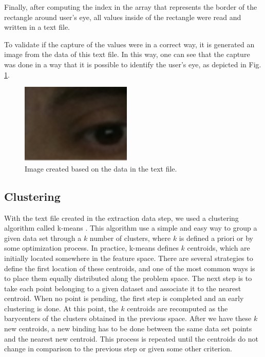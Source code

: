 \documentclass[10pt, conference]{IEEEtran}
\begin{document}
	Finally, after computing the index in the array that represents the border of the rectangle around user's eye, all values inside of the rectangle were read and written in a text file. 

	To validate if the capture of the values were in a correct way, it is generated an image from the data of this text file. 
	In this way, one can see that the capture was done in a way that it is possible to identify the user's eye, as depicted in Fig. \ref{fig:fig13}.

    \begin{figure}[t]
      \centering
      \includegraphics{figures/pic13.png}
      \caption{Image created based on the data in the text file.}
      \label{fig:fig13}
    \end{figure}

\subsection{Clustering}

	With the text file created in the extraction data step, we used a clustering algorithm called k-means \cite{13}. 
	This algorithm use a simple and easy way to group a given data set through a $k$ number of clusters, where $k$ is defined a priori or by some optimization process.
	In practice, k-means defines $k$ centroids, which are initially located somewhere in the feature space.
    There are several strategies to define the first location of these centroids, and one of the most common ways is to place them equally distributed along the problem space.
	The next step is to take each point belonging to a given dataset and associate it to the nearest centroid. 
    When no point is pending, the first step is completed and an early clustering is done. 
	At this point, the $k$ centroids are recomputed as the barycenters of the clusters obtained in the previous space.
	After we have these $k$ new centroids, a new binding has to be done between the same data set points and the nearest new centroid. 
    This process is repeated until the centroids do not change in comparison to the previous step or given some other criterion.
\end{document}
